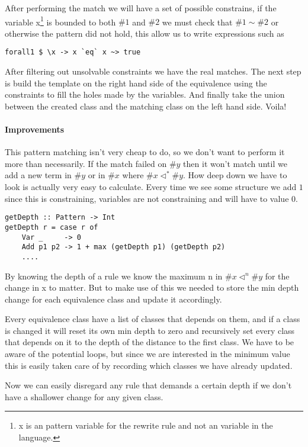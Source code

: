 After performing the match we will have a set of possible constrains, if the variable x\footnote{x is an pattern variable for the rewrite rule and not an variable in the language.}
 is bounded to both $\#1$ and $\#2$ we must check that $\#1 \sim \#2$ or otherwise the pattern did not hold, this allow us to write expressions such as

\begin{verbatim}
forall1 $ \x -> x `eq` x ~> true
\end{verbatim}

After filtering out unsolvable constraints we have the real matches. The next step is build the template on the right hand side of the equivalence using the constraints to fill the holes made by the variables. And finally take the union between the created class and the matching class on the left hand side. Voila!

\paragraph{Improvements} This pattern matching isn't very cheap to do, so we don't want to perform it more than necessarily. If the match failed on $\#y$ then it won't match until we add a new term in $\#y$ or in $\#x$ where $\#x \lhd^* \#y$. How deep down we have to look is actually very easy to calculate. Every time we see some structure we add $1$ since this is constraining, variables are not constraining and will have to value 0. 

\begin{verbatim}
getDepth :: Pattern -> Int
getDepth r = case r of
    Var _     -> 0
    Add p1 p2 -> 1 + max (getDepth p1) (getDepth p2)
    ....
\end{verbatim}

By knowing the depth of a rule we know the maximum n in $\#x \lhd^n \#y$ for the change in x to matter. But to make use of this we needed to store the min depth change for each equivalence class and update it accordingly.

Every equivalence class have a list of classes that depends on them, and if a class is changed it will reset its own min depth to zero and recursively set every class that depends on it to the depth of the distance to the first class. We have to be aware of the potential loops, but since we are interested in the minimum value this is easily taken care of by recording which classes we have already updated.

Now we can easily disregard any rule that demands a certain depth if we don't have a shallower change for any given class.


